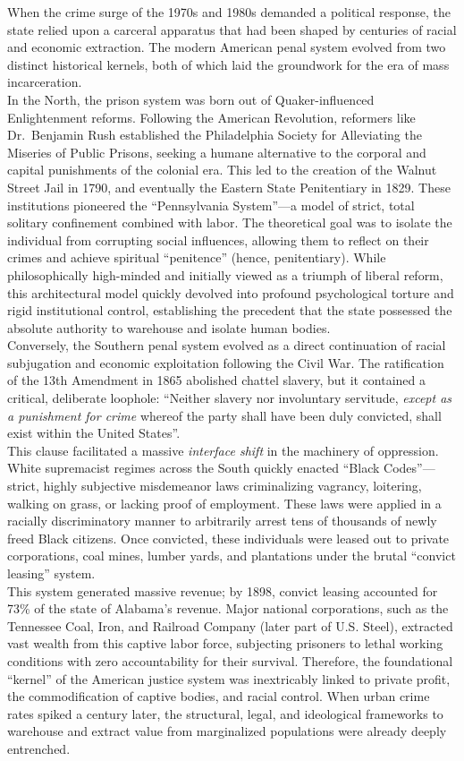 \documentclass[
]{article}
\begin{document}
When the crime surge of the 1970s and 1980s demanded a political
response, the state relied upon a carceral apparatus that had been
shaped by centuries of racial and economic extraction. The modern
American penal system evolved from two distinct historical kernels, both
of which laid the groundwork for the era of mass incarceration.\\
In the North, the prison system was born out of Quaker-influenced
Enlightenment reforms. Following the American Revolution, reformers like
Dr.~Benjamin Rush established the Philadelphia Society for Alleviating
the Miseries of Public Prisons, seeking a humane alternative to the
corporal and capital punishments of the colonial era. This led to the
creation of the Walnut Street Jail in 1790, and eventually the Eastern
State Penitentiary in 1829. These institutions pioneered the
``Pennsylvania System''---a model of strict, total solitary confinement
combined with labor. The theoretical goal was to isolate the individual
from corrupting social influences, allowing them to reflect on their
crimes and achieve spiritual ``penitence'' (hence, penitentiary). While
philosophically high-minded and initially viewed as a triumph of liberal
reform, this architectural model quickly devolved into profound
psychological torture and rigid institutional control, establishing the
precedent that the state possessed the absolute authority to warehouse
and isolate human bodies.\\
Conversely, the Southern penal system evolved as a direct continuation
of racial subjugation and economic exploitation following the Civil War.
The ratification of the 13th Amendment in 1865 abolished chattel
slavery, but it contained a critical, deliberate loophole: ``Neither
slavery nor involuntary servitude, \emph{except as a punishment for
crime} whereof the party shall have been duly convicted, shall exist
within the United States''.\\
This clause facilitated a massive \emph{interface shift} in the
machinery of oppression. White supremacist regimes across the South
quickly enacted ``Black Codes''---strict, highly subjective misdemeanor
laws criminalizing vagrancy, loitering, walking on grass, or lacking
proof of employment. These laws were applied in a racially
discriminatory manner to arbitrarily arrest tens of thousands of newly
freed Black citizens. Once convicted, these individuals were leased out
to private corporations, coal mines, lumber yards, and plantations under
the brutal ``convict leasing'' system.\\
This system generated massive revenue; by 1898, convict leasing
accounted for 73\% of the state of Alabama's revenue. Major national
corporations, such as the Tennessee Coal, Iron, and Railroad Company
(later part of U.S. Steel), extracted vast wealth from this captive
labor force, subjecting prisoners to lethal working conditions with zero
accountability for their survival. Therefore, the foundational
``kernel'' of the American justice system was inextricably linked to
private profit, the commodification of captive bodies, and racial
control. When urban crime rates spiked a century later, the structural,
legal, and ideological frameworks to warehouse and extract value from
marginalized populations were already deeply entrenched.
\end{document}
